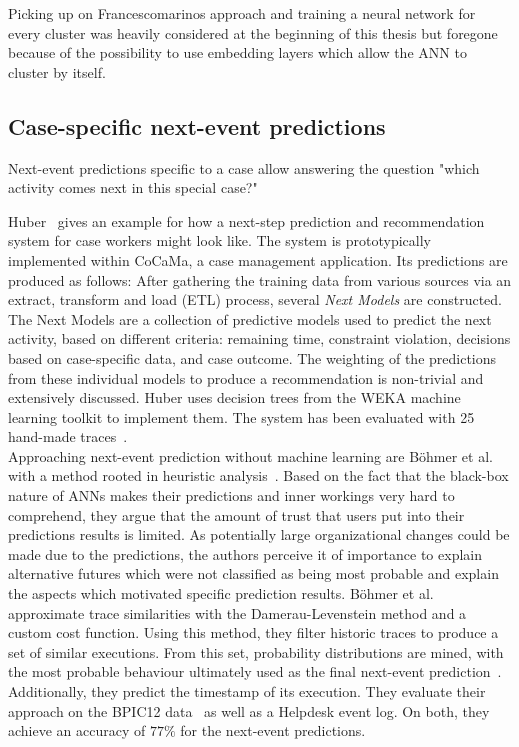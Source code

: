 Picking up on Francescomarinos approach and training a neural network for every cluster was heavily considered at the beginning of this thesis but foregone because of the possibility to use embedding layers which allow the ANN to cluster by itself.

\subsection*{Case-specific next-event predictions}
Next-event predictions specific to a case allow answering the question "which activity comes next in this special case?"

Huber~\cite{hauder2014} gives an example for how a next-step prediction and recommendation system for case workers might look like. The system is prototypically implemented within CoCaMa, a case management application. Its predictions are produced as follows: After gathering the training data from various sources via an extract, transform and load (ETL) process, several \textit{Next Models} are constructed. The Next Models are a collection of predictive models used to predict the next activity, based on different criteria: remaining time, constraint violation, decisions based on case-specific data, and case outcome. The weighting of the predictions from these individual models to produce a recommendation is non-trivial and extensively discussed. Huber uses decision trees from the WEKA \cite{web:weka} machine learning toolkit to implement them. The system has been evaluated with 25 hand-made traces~\cite{huber2015}.\\

Approaching next-event prediction without machine learning are Böhmer et al. with a method rooted in heuristic analysis~\cite{boehmer2018probability}. Based on the fact that the black-box nature of ANNs makes their predictions and inner workings very hard to comprehend, they argue that the amount of trust that users put into their predictions results is limited. As potentially large organizational changes could be made due to the predictions, the authors perceive it of importance to explain alternative futures which were not classified as being most probable and explain the aspects which motivated specific prediction results.
Böhmer et al. approximate trace similarities with the Damerau-Levenstein method and a custom cost function. Using this method, they filter historic traces to produce a set of similar executions. From this set, probability distributions are mined, with the most probable behaviour ultimately used as the final next-event prediction~\cite{boehmer2018probability}. Additionally, they predict the timestamp of its execution. They evaluate their approach on the BPIC12 data~\cite{BPIC2012} as well as a Helpdesk event log. On both, they achieve an accuracy of $77\%$ for the next-event predictions.\\

